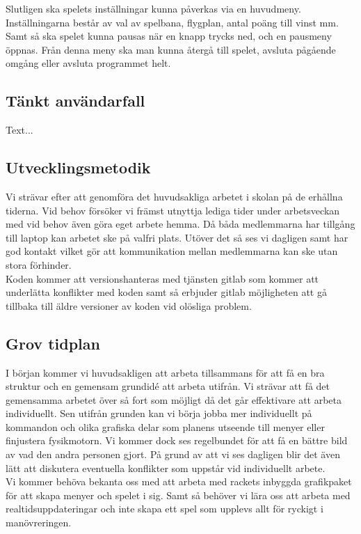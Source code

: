 \documentclass[12pt,a4paper]{article}
\begin{document}
Slutligen ska spelets inställningar kunna påverkas via en huvudmeny. Inställningarna består av val av spelbana, flygplan, antal poäng till vinst mm. Samt så ska spelet kunna pausas när en knapp trycks ned, och en pausmeny öppnas. Från denna meny ska man kunna återgå till spelet, avsluta pågående omgång eller avsluta programmet helt. \\


\subsection{Tänkt användarfall}
Text... \\


\subsection{Utvecklingsmetodik}
Vi strävar efter att genomföra det huvudsakliga arbetet i skolan på de erhållna tiderna. Vid behov försöker vi främst utnyttja lediga tider under arbetsveckan med vid behov även göra eget arbete hemma. Då båda medlemmarna har tillgång till laptop kan arbetet ske på valfri plats. Utöver det så ses vi dagligen samt har god kontakt vilket gör att kommunikation mellan medlemmarna kan ske utan stora förhinder. \\

Koden kommer att versionshanteras med tjänsten gitlab som kommer att underlätta konflikter med koden samt så erbjuder gitlab möjligheten att gå tillbaka till äldre versioner av koden vid olösliga problem.

\subsection{Grov tidplan}
I början kommer vi huvudsakligen att arbeta tillsammans för att få en bra struktur och en gemensam grundidé att arbeta utifrån. Vi strävar att få det gemensamma arbetet över så fort som möjligt då det går effektivare att arbeta individuellt. Sen utifrån grunden kan vi börja jobba mer individuellt på kommandon och olika grafiska delar som planens utseende till menyer eller finjustera fysikmotorn. Vi kommer dock ses regelbundet för att få en bättre bild av vad den andra personen gjort. På grund av att vi ses dagligen blir det även lätt att diskutera eventuella konflikter som uppstår vid individuellt arbete. \\

Vi kommer behöva bekanta oss med att arbeta med rackets inbyggda grafikpaket för att skapa menyer och spelet i sig. Samt så behöver vi lära oss att arbeta med realtidsuppdateringar och inte skapa ett spel som upplevs allt för ryckigt i manövreringen. \\
\end{document}
